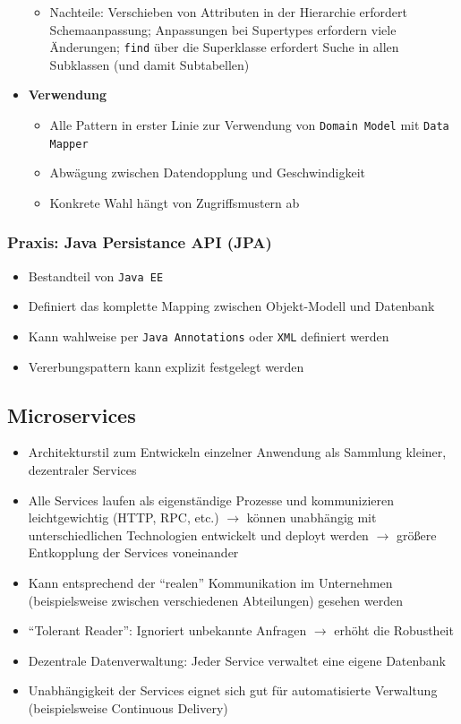 \begin{itemize}
\begin{itemize}
		\item Nachteile: Verschieben von Attributen in der Hierarchie erfordert Schemaanpassung; Anpassungen bei Supertypes erfordern viele Änderungen; \texttt{find} über die Superklasse erfordert Suche in allen Subklassen (und damit Subtabellen)
	\end{itemize}
	\item \textbf{Verwendung}
	\begin{itemize}
		\item Alle Pattern in erster Linie zur Verwendung von \texttt{Domain Model} mit \texttt{Data Mapper}
		\item Abwägung zwischen Datendopplung und Geschwindigkeit
		\item Konkrete Wahl hängt von Zugriffsmustern ab
	\end{itemize}
\end{itemize}


\subsubsection{Praxis: Java Persistance API (JPA)}
\begin{itemize}
	\item Bestandteil von \texttt{Java EE}
	\item Definiert das komplette Mapping zwischen Objekt-Modell und Datenbank
	\item Kann wahlweise per \texttt{Java Annotations} oder \texttt{XML} definiert werden
	\item Vererbungspattern kann explizit festgelegt werden
\end{itemize}


\subsection{Microservices}
\begin{itemize}
	\item Architekturstil zum Entwickeln einzelner Anwendung als Sammlung kleiner, dezentraler Services
	\item Alle Services laufen als eigenständige Prozesse und kommunizieren leichtgewichtig (HTTP, RPC, etc.) \(\rightarrow\) können unabhängig mit unterschiedlichen Technologien entwickelt und deployt werden \(\rightarrow\) größere Entkopplung der Services voneinander
	\item Kann entsprechend der "`realen"' Kommunikation im Unternehmen (beispielsweise zwischen verschiedenen Abteilungen) gesehen werden
	\item "`Tolerant Reader"': Ignoriert unbekannte Anfragen \(\rightarrow\) erhöht die Robustheit
	\item Dezentrale Datenverwaltung: Jeder Service verwaltet eine eigene Datenbank
	\item Unabhängigkeit der Services eignet sich gut für automatisierte Verwaltung (beispielsweise Continuous Delivery)
\end{itemize}




